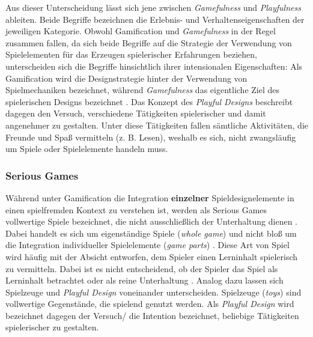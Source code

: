 Aus dieser Unterscheidung lässt sich jene zwischen \textit{Gamefulness} und \textit{Playfulness} ableiten. Beide Begriffe bezeichnen die Erlebnis- und Verhaltenseigenschaften der jeweiligen Kategorie. Obwohl Gamification und \textit{Gamefulness} in der Regel zusammen fallen, da sich beide Begriffe auf die Strategie der Verwendung von Spielelementen für das Erzeugen spielerischer Erfahrungen beziehen, unterscheiden sich die Begriffe hinsichtlich ihrer intensionalen Eigenschaften: Als Gamification wird die Designstrategie hinter der Verwendung von Spielmechaniken bezeichnet, während \textit{Gamefulness} das eigentliche Ziel des spielerischen Designs bezeichnet \cite{deterding_game_2011}. Das Konzept des \textit{Playful Designs} beschreibt dagegen den Versuch, verschiedene Tätigkeiten spielerischer und damit angenehmer zu gestalten. Unter diese Tätigkeiten fallen sämtliche Aktivitäten, die Freunde und Spaß vermitteln (z. B. Lesen), weshalb es sich, nicht zwangsläufig um Spiele oder Spielelemente handeln muss.


\subsubsection{Serious Games}
Während unter Gamification die Integration \textbf{einzelner} Spieldesignelemente in einen spielfremden Kontext zu verstehen ist, werden als Serious Games vollwertige Spiele bezeichnet, die nicht ausschließlich der Unterhaltung dienen \cite[S. 17]{michael_serious_2005}. Dabei handelt es sich um eigenständige Spiele (\textit{whole game}) und nicht bloß um die Integration individueller Spielelemente (\textit{game parts}) \cite{deterding_game_2011}. Diese Art von Spiel wird häufig mit der Absicht entworfen, dem Spieler einen Lerninhalt spielerisch zu vermitteln. Dabei ist es nicht entscheidend, ob der Spieler das Spiel als Lerninhalt betrachtet oder als reine Unterhaltung \cite[S.3]{bopp_serious_2009}. Analog dazu lassen sich Spielzeuge und \textit{Playful Design} voneinander unterscheiden. Spielzeuge (\textit{toys}) sind vollwertige Gegenstände, die spielend genutzt werden. Als \textit{Playful Design} wird bezeichnet dagegen der Versuch/ die Intention bezeichnet, beliebige Tätigkeiten spielerischer zu gestalten.


